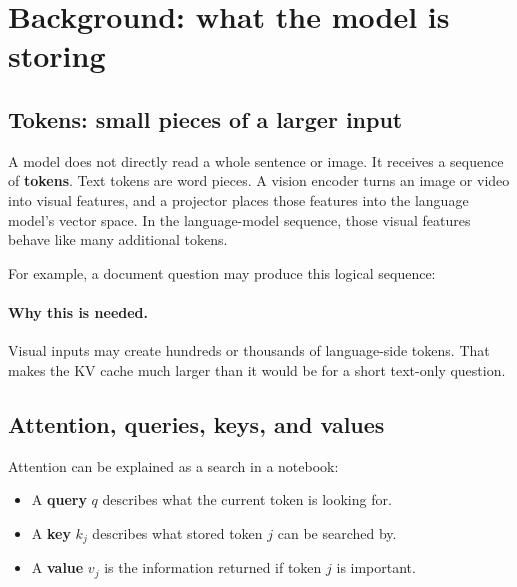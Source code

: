 \documentclass[11pt]{article}
\newcommand{\term}[1]{\textbf{#1}}
\newcommand{\why}{\paragraph{Why this is needed.}}
\begin{document}
\section{Background: what the model is storing}
\label{sec:background}

\subsection{Tokens: small pieces of a larger input}

A model does not directly read a whole sentence or image. It receives a sequence of \term{tokens}.
Text tokens are word pieces. A vision encoder turns an image or video into visual features, and a
projector places those features into the language model's vector space. In the language-model
sequence, those visual features behave like many additional tokens.

For example, a document question may produce this logical sequence:

\begin{center}
\end{center}

\why Visual inputs may create hundreds or thousands of language-side tokens. That makes the KV
cache much larger than it would be for a short text-only question.

\subsection{Attention, queries, keys, and values}

Attention can be explained as a search in a notebook:

\begin{itemize}
  \item A \term{query} $q$ describes what the current token is looking for.
  \item A \term{key} $k_j$ describes what stored token $j$ can be searched by.
  \item A \term{value} $v_j$ is the information returned if token $j$ is important.
\end{itemize}
\end{document}
